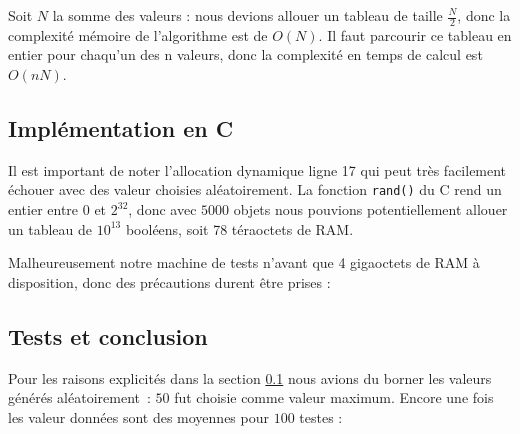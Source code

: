 Soit $N$ la somme des valeurs : nous devions allouer un tableau de taille $\frac{N}{2}$, donc la complexité mémoire de l'algorithme est de $O(N).$ Il faut parcourir ce tableau en entier pour chaqu'un des n valeurs, donc la complexité en temps de calcul est $O(nN)$. 


\subsection{Implémentation en C}
\label{implementation_c}
Il est important de noter l'allocation dynamique ligne 17 qui peut très facilement échouer avec des valeur choisies aléatoirement. La fonction \texttt{rand()} du C rend un entier entre $0$ et $2^{32}$, donc avec $5000$ objets nous pouvions potentiellement allouer un tableau de $10^{13}$ booléens, soit 78 téraoctets de RAM.

Malheureusement notre machine de tests n'avant que 4 gigaoctets de RAM à disposition, donc des précautions durent être prises :

\vspace{0.5cm}

 

\subsection{Tests et conclusion}

Pour les raisons explicités dans la section \ref{implementation_c} nous avions du borner les valeurs générés aléatoirement~: $50$ fut choisie comme valeur maximum. Encore une fois les valeur données sont des moyennes pour $100$ testes :

